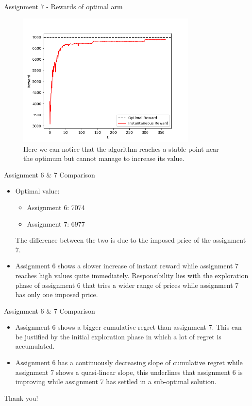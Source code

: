 \documentclass[11pt]{beamer}
\begin{document}
\begin{frame}{Assignment 7 - Rewards of optimal arm}
\begin{figure}[hbtp]
\centering
\includegraphics[width=0.8\textwidth]{images/assignment_7_regrets_arm_3_inst_reward.png}
\caption{Here we can notice that the algorithm reaches a stable point near the optimum but cannot manage to increase its value.}
\end{figure}
\end{frame}

\begin{frame}{Assignment 6 \& 7 Comparison}
	\begin{itemize}
		\item Optimal value:
		\begin{itemize}
			\item Assignment 6: 7074
			\item Assignment 7: 6977
		\end{itemize}
		The difference between the two is due to the imposed price of the assignment 7.
		\item Assignment 6 shows a slower increase of instant reward while assignment 7 reaches high values quite immediately. Responsibility lies with the exploration phase of assignment 6 that tries a wider range of prices while assignment 7 has only one imposed price.
	\end{itemize}
\end{frame}

\begin{frame}{Assignment 6 \& 7 Comparison}
	\begin{itemize}
		\item Assignment 6 shows a bigger cumulative regret than assignment 7. This can be justified by the initial exploration phase in which a lot of regret is accumulated.
		\item Assignment 6 has a continuously decreasing slope of cumulative regret while assignment 7 shows a quasi-linear slope, this underlines that assignment 6 is improving while assignment 7 has settled in a sub-optimal solution.
	\end{itemize}
\end{frame}

\begin{frame}{}
	\huge{Thank you!}
\end{frame}
\end{document}
